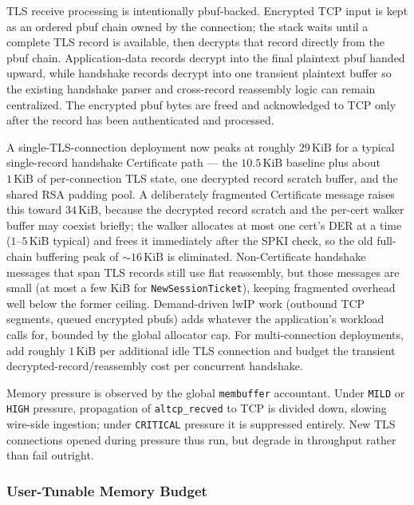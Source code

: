 \documentclass[titlepage]{report}
\begin{document}
			TLS receive processing is intentionally pbuf-backed. Encrypted TCP input is kept as an ordered pbuf chain owned by the connection; the stack waits until a complete TLS record is available, then decrypts that record directly from the pbuf chain. Application-data records decrypt into the final plaintext pbuf handed upward, while handshake records decrypt into one transient plaintext buffer so the existing handshake parser and cross-record reassembly logic can remain centralized. The encrypted pbuf bytes are freed and acknowledged to TCP only after the record has been authenticated and processed.

			A single-TLS-connection deployment now peaks at roughly $29\,\text{KiB}$ for a typical single-record handshake Certificate path --- the $10.5\,\text{KiB}$ baseline plus about $1\,\text{KiB}$ of per-connection TLS state, one decrypted record scratch buffer, and the shared RSA padding pool. A deliberately fragmented Certificate message raises this toward $34\,\text{KiB}$, because the decrypted record scratch and the per-cert walker buffer may coexist briefly; the walker allocates at most one cert's DER at a time ($1$--$5\,\text{KiB}$ typical) and frees it immediately after the SPKI check, so the old full-chain buffering peak of ${\sim}16\,\text{KiB}$ is eliminated. Non-Certificate handshake messages that span TLS records still use flat reassembly, but those messages are small (at most a few KiB for \texttt{NewSessionTicket}), keeping fragmented overhead well below the former ceiling. Demand-driven lwIP work (outbound TCP segments, queued encrypted pbufs) adds whatever the application's workload calls for, bounded by the global allocator cap. For multi-connection deployments, add roughly $1\,\text{KiB}$ per additional idle TLS connection and budget the transient decrypted-record/reassembly cost per concurrent handshake.

			Memory pressure is observed by the global \texttt{membuffer} accountant. Under \texttt{MILD} or \texttt{HIGH} pressure, propagation of \texttt{altcp\_recved} to TCP is divided down, slowing wire-side ingestion; under \texttt{CRITICAL} pressure it is suppressed entirely. New TLS connections opened during pressure thus run, but degrade in throughput rather than fail outright.

			\subsubsection{User-Tunable Memory Budget}
\end{document}
